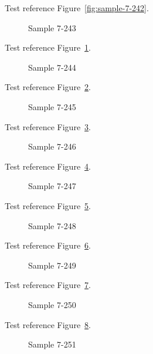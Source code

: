 Test reference Figure~\ref{fig:sample-7-242}.

\begin{figure}[tbhp]
\caption{Sample 7-243}
\label{fig:sample-7-243}
\end{figure}

Test reference Figure~\ref{fig:sample-7-243}.

\begin{figure}[tbhp]
\caption{Sample 7-244}
\label{fig:sample-7-244}
\end{figure}

Test reference Figure~\ref{fig:sample-7-244}.

\begin{figure}[tbhp]
\caption{Sample 7-245}
\label{fig:sample-7-245}
\end{figure}

Test reference Figure~\ref{fig:sample-7-245}.

\begin{figure}[tbhp]
\caption{Sample 7-246}
\label{fig:sample-7-246}
\end{figure}

Test reference Figure~\ref{fig:sample-7-246}.

\begin{figure}[tbhp]
\caption{Sample 7-247}
\label{fig:sample-7-247}
\end{figure}

Test reference Figure~\ref{fig:sample-7-247}.

\begin{figure}[tbhp]
\caption{Sample 7-248}
\label{fig:sample-7-248}
\end{figure}

Test reference Figure~\ref{fig:sample-7-248}.

\begin{figure}[tbhp]
\caption{Sample 7-249}
\label{fig:sample-7-249}
\end{figure}

Test reference Figure~\ref{fig:sample-7-249}.

\begin{figure}[tbhp]
\caption{Sample 7-250}
\label{fig:sample-7-250}
\end{figure}

Test reference Figure~\ref{fig:sample-7-250}.

\begin{figure}[tbhp]
\caption{Sample 7-251}
\label{fig:sample-7-251}
\end{figure}

